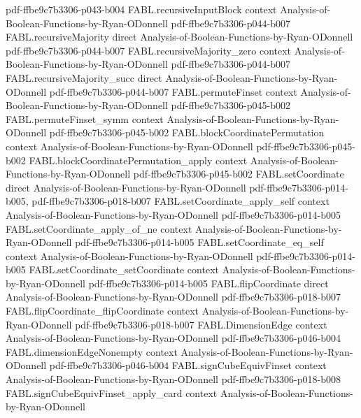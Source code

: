 \begin{theorem}
  {pdf-ffbe9c7b3306-p043-b004}
\proofstep
  {FABL.recursiveInputBlock}
  {context}
  {Analysis-of-Boolean-Functions-by-Ryan-ODonnell}
  {pdf-ffbe9c7b3306-p044-b007}
\proofstep
  {FABL.recursiveMajority}
  {direct}
  {Analysis-of-Boolean-Functions-by-Ryan-ODonnell}
  {pdf-ffbe9c7b3306-p044-b007}
\proofstep
  {FABL.recursiveMajority_zero}
  {context}
  {Analysis-of-Boolean-Functions-by-Ryan-ODonnell}
  {pdf-ffbe9c7b3306-p044-b007}
\proofstep
  {FABL.recursiveMajority_succ}
  {direct}
  {Analysis-of-Boolean-Functions-by-Ryan-ODonnell}
  {pdf-ffbe9c7b3306-p044-b007}
\proofstep
  {FABL.permuteFinset}
  {context}
  {Analysis-of-Boolean-Functions-by-Ryan-ODonnell}
  {pdf-ffbe9c7b3306-p045-b002}
\proofstep
  {FABL.permuteFinset_symm}
  {context}
  {Analysis-of-Boolean-Functions-by-Ryan-ODonnell}
  {pdf-ffbe9c7b3306-p045-b002}
\proofstep
  {FABL.blockCoordinatePermutation}
  {context}
  {Analysis-of-Boolean-Functions-by-Ryan-ODonnell}
  {pdf-ffbe9c7b3306-p045-b002}
\proofstep
  {FABL.blockCoordinatePermutation_apply}
  {context}
  {Analysis-of-Boolean-Functions-by-Ryan-ODonnell}
  {pdf-ffbe9c7b3306-p045-b002}
\proofstep
  {FABL.setCoordinate}
  {direct}
  {Analysis-of-Boolean-Functions-by-Ryan-ODonnell}
  {pdf-ffbe9c7b3306-p014-b005,
    pdf-ffbe9c7b3306-p018-b007}
\proofstep
  {FABL.setCoordinate_apply_self}
  {context}
  {Analysis-of-Boolean-Functions-by-Ryan-ODonnell}
  {pdf-ffbe9c7b3306-p014-b005}
\proofstep
  {FABL.setCoordinate_apply_of_ne}
  {context}
  {Analysis-of-Boolean-Functions-by-Ryan-ODonnell}
  {pdf-ffbe9c7b3306-p014-b005}
\proofstep
  {FABL.setCoordinate_eq_self}
  {context}
  {Analysis-of-Boolean-Functions-by-Ryan-ODonnell}
  {pdf-ffbe9c7b3306-p014-b005}
\proofstep
  {FABL.setCoordinate_setCoordinate}
  {context}
  {Analysis-of-Boolean-Functions-by-Ryan-ODonnell}
  {pdf-ffbe9c7b3306-p014-b005}
\proofstep
  {FABL.flipCoordinate}
  {direct}
  {Analysis-of-Boolean-Functions-by-Ryan-ODonnell}
  {pdf-ffbe9c7b3306-p018-b007}
\proofstep
  {FABL.flipCoordinate_flipCoordinate}
  {context}
  {Analysis-of-Boolean-Functions-by-Ryan-ODonnell}
  {pdf-ffbe9c7b3306-p018-b007}
\proofstep
  {FABL.DimensionEdge}
  {context}
  {Analysis-of-Boolean-Functions-by-Ryan-ODonnell}
  {pdf-ffbe9c7b3306-p046-b004}
\proofstep
  {FABL.dimensionEdgeNonempty}
  {context}
  {Analysis-of-Boolean-Functions-by-Ryan-ODonnell}
  {pdf-ffbe9c7b3306-p046-b004}
\proofstep
  {FABL.signCubeEquivFinset}
  {context}
  {Analysis-of-Boolean-Functions-by-Ryan-ODonnell}
  {pdf-ffbe9c7b3306-p018-b008}
\proofstep
  {FABL.signCubeEquivFinset_apply_card}
  {context}
  {Analysis-of-Boolean-Functions-by-Ryan-ODonnell}

\end{theorem}
